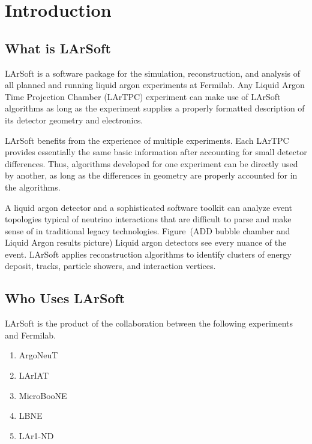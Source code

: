 \documentclass[12pt]{elsarticle}
\newcommand{\larsoft}{LArSoft }
\begin{document}
\maketitle
{}
\section{Introduction}
\subsection{What is \larsoft}
\larsoft is a software package for the simulation, reconstruction, and analysis of all planned and running liquid argon experiments at Fermilab. Any Liquid Argon Time Projection Chamber (LArTPC) experiment can make use of \larsoft algorithms as long as the experiment supplies a properly formatted description of its detector geometry and electronics. 

\larsoft  benefits from the experience of multiple experiments.  Each LArTPC provides essentially the same basic information after accounting for small detector differences.  Thus, algorithms developed for one experiment can be directly used by another, as long as the differences in geometry are properly accounted for in the algorithms.  

A liquid argon detector and a sophisticated software toolkit can analyze event topologies typical of neutrino interactions that are difficult to parse and make sense of in traditional legacy technologies. Figure~(ADD bubble chamber and Liquid Argon results picture)
Liquid argon detectors see every nuance of the event. \larsoft applies reconstruction algorithms to identify clusters of energy deposit, tracks, particle showers, and interaction vertices.

\subsection{Who Uses \larsoft}
\larsoft is the product of the collaboration between the following experiments and Fermilab.
\begin{enumerate}
\item ArgoNeuT
\item LArIAT
\item MicroBooNE
\item LBNE
\item LAr1-ND
\end{enumerate}
\end{document}
